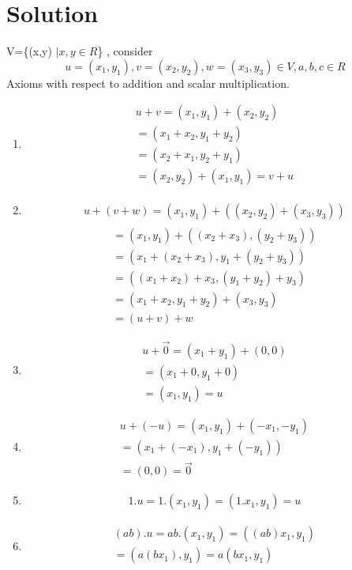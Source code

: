 \documentclass[journal,12pt,twocolumn]{IEEEtran}
\begin{document}
\section{Solution}
V=\{(x,y) $\vert x,y \in R$\} , consider $$u = (x_1,y_1) , v = (x_2,y_2) , w = (x_3,y_3) \in V , a,b,c \in R$$ Axioms with respect to addition and scalar multiplication.
\begin{enumerate}
 \item
 \begin{align}
 u+v = (x_1,y_1)+(x_2,y_2)\\
     = (x_1+x_2,y_1+y_2)\\
     = (x_2+x_1,y_2+y_1)\\
     = (x_2,y_2)+(x_1,y_1)
     = v + u 
 \end{align}
 \item 
\begin{multline}
\begin{aligned}
u+(v+w)=(x_1,y_1)+((x_2,y_2)+(x_3,y_3))
\end{aligned}
\end{multline}
\begin{align}
=(x_1,y_1)+((x_2+x_3),(y_2+y_3))\\
=(x_1+(x_2+x_3),y_1+(y_2+y_3))\\
=((x_1+x_2)+x_3,(y_1+y_2)+y_3)\\
=(x_1+x_2,y_1+y_2)+(x_3,y_3)\\
=(u+v)+w 
\end{align}
 \item 
 \begin{align}
 u+\vec{0} = (x_1+y_1)+(0,0)\\
     = (x_1+0,y_1+0)\\
     =(x_1,y_1)=u
 \end{align}
 \item 
 \begin{align}
 u + (-u) = (x_1,y_1)+(-x_1,-y_1)\\
          = (x_1+(-x_1),y_1+(-y_1))\\
          = (0 , 0) = \vec{0} 
 \end{align}
 \item 
 \begin{align}
 1.u = 1.(x_1,y_1) = (1.x_1,y_1) = u 
 \end{align}
 \item 
 \begin{align}
  (ab).u = ab.(x_1,y_1)=((ab)x_1,y_1)\\
  =(a(bx_1),y_1)=a(bx_1,y_1)\\

\end{align}
\end{enumerate}
\end{document}
